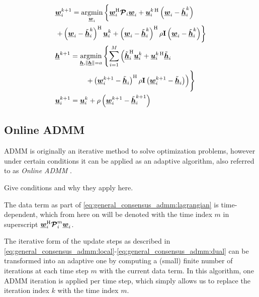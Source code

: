 \documentclass{article}
\newcommand{\hf}{\underline{\bm{h}}}
\newcommand{\wf}{\underline{\bm{w}}}
\newcommand{\uuf}{\underline{\bm{u}}}
\newcommand{\aRhof}{\bm{\mathcal{P}}}
\newcommand{\I}{\mtxb{I}}
\begin{document}
\begin{align}
    &\wf_i^{k+1} = \underset{\wf_i}{\operatorname{argmin}} \left\{ \wf_i^\herm \aRhof_i \wf_i + \uuf_i^{k\,\herm} \left(\wf_i - \tilde{\hf}_i^{k}\right) \vphantom{+ \left\| \wf_i - \tilde{\hf}_i^{k} \right\|^2}\right.\nonumber\\
    &\left.+ \left(\wf_i - \tilde{\hf}_i^{k}\right)^\herm \uuf_i^{k} + \left( \wf_i - \tilde{\hf}_i^{k} \right)^\herm \rho \I \left( \wf_i - \tilde{\hf}_i^{k} \right) \right\}\label{eq:general_consensus_admm:local}\\
    &\hf^{k+1} = \underset{\hf, \|\hf\| = a}{\operatorname{argmin}} \left\{ \sum_{i=1}^{M} \left( \tilde{\hf}_i^{\herm} \uuf_i^{k} + \uuf_i^{k\,\herm} \tilde{\hf}_i \vphantom{\frac{\rho}{2} \| \wf_i^{k+1} - \tilde{\hf}_i \|^2} \right.\right.\nonumber\\
    &\left. \qquad \qquad \vphantom{\sum_{i=1}^{M} pp } \left.+ \left( \wf_i^{k+1} - \tilde{\hf}_i \right)^\herm \rho \I \left( \wf_i^{k+1} - \tilde{\hf}_i \right)  \right) \right\}\label{eq:general_consensus_admm:global}\\
    &\uuf_i^{k+1} = \uuf_i^{k} + \rho \left( \wf_i^{k+1} - \tilde{\hf}_i^{k+1} \right)\label{eq:general_consensus_admm:dual}
\end{align}

\subsection{Online ADMM}
\label{ssec:online_admm}
ADMM is originally an iterative method to solve optimization problems, however under certain conditions it can be applied as an adaptive algorithm, also referred to as \emph{Online ADMM} \cite{}.
\begin{attention}
    Give conditions and why they apply here.
\end{attention}
The data term as part of \eqref{eq:general_consensus_admm:lagrangian} is time-dependent, which from here on  will be denoted with the time index \(m\) in superscript \(\wf_i^\herm \aRhof_i^{m} \wf_i\).

The iterative form of the update steps as described in \eqref{eq:general_consensus_admm:local}-\eqref{eq:general_consensus_admm:dual} can be transformed into an adaptive one by computing a (small) finite number of iterations at each time step \(m\) with the current data term.
In this algorithm, one ADMM iteration is applied per time step, which simply allows us to replace the iteration index \(k\) with the time index \(m\).
\end{document}
